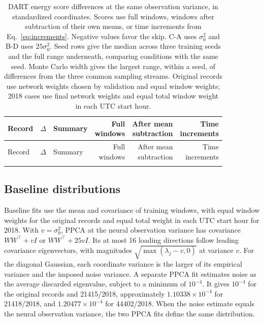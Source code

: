 \documentclass{article}
\begin{document}
\begingroup
\setlength{\tabcolsep}{2.4pt}
\begin{longtable}{lllrrr}
\caption{DART energy score differences at the same observation variance, in standardized coordinates. Scores use full windows, windows after subtraction of their own means, or time increments from Eq.~\ref{eq:increments}. Negative values favor the skip. C-A uses $\sigma_0^2$ and B-D uses $25\sigma_0^2$. Seed rows give the median across three training seeds and the full range underneath, comparing conditions with the same seed. Monte Carlo width gives the largest range, within a seed, of differences from the three common sampling streams. Original records use network weights chosen by validation and equal window weights; 2018 cases use final network weights and equal total window weight in each UTC start hour.}\label{tab:dart_contrasts}\\
\toprule
Record & $\Delta$ & Summary & \shortstack{Full\\windows} & \shortstack{After mean\\subtraction} & \shortstack{Time\\increments}\\
\midrule
\endfirsthead
\toprule
Record & $\Delta$ & Summary & \shortstack{Full\\windows} & \shortstack{After mean\\subtraction} & \shortstack{Time\\increments}\\
\midrule
\endhead
\\
\bottomrule
\end{longtable}
\endgroup

\subsection{Baseline distributions}
\label{sec:reference_distributions}
Baseline fits use the mean and covariance of training windows, with equal window weights for the original records and equal total weight in each UTC start hour for 2018. With $v=\sigma_0^2$, PPCA at the neural observation variance has covariance $WW^\top+vI$ or $WW^\top+25vI$. Its at most 16 loading directions follow leading covariance eigenvectors, with magnitudes $\sqrt{\max(\lambda_j-v,0)}$ at variance $v$. For the diagonal Gaussian, each coordinate variance is the larger of its empirical variance and the imposed noise variance. A separate PPCA fit estimates noise as the average discarded eigenvalue, subject to a minimum of $10^{-4}$. It gives $10^{-4}$ for the original records and 21415/2018, approximately $1.10338\times10^{-4}$ for 21418/2018, and $1.20477\times10^{-4}$ for 44402/2018. When the noise estimate equals the neural observation variance, the two PPCA fits define the same distribution.
\end{document}
